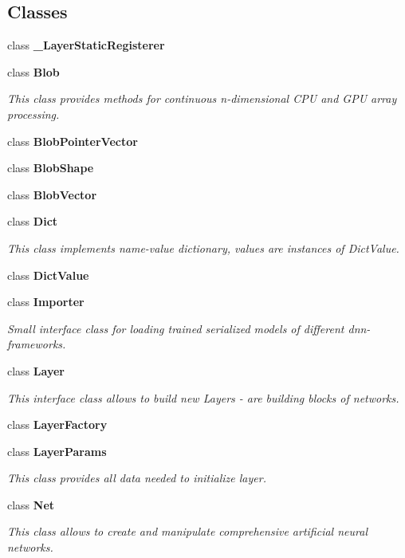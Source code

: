 \subsection*{Classes}
\begin{DoxyCompactItemize}
\item 
class {\bfseries \+\_\+\+Layer\+Static\+Registerer}
\item 
class {\bfseries Blob}
\begin{DoxyCompactList}\small\item\em This class provides methods for continuous n-\/dimensional C\+PU and G\+PU array processing. \end{DoxyCompactList}\item 
class {\bfseries Blob\+Pointer\+Vector}
\item 
class {\bfseries Blob\+Shape}
\item 
class {\bfseries Blob\+Vector}
\item 
class {\bfseries Dict}
\begin{DoxyCompactList}\small\item\em This class implements name-\/value dictionary, values are instances of Dict\+Value. \end{DoxyCompactList}\item 
class {\bfseries Dict\+Value}
\item 
class {\bfseries Importer}
\begin{DoxyCompactList}\small\item\em Small interface class for loading trained serialized models of different dnn-\/frameworks. \end{DoxyCompactList}\item 
class {\bfseries Layer}
\begin{DoxyCompactList}\small\item\em This interface class allows to build new Layers -\/ are building blocks of networks. \end{DoxyCompactList}\item 
class {\bfseries Layer\+Factory}
\item 
class {\bfseries Layer\+Params}
\begin{DoxyCompactList}\small\item\em This class provides all data needed to initialize layer. \end{DoxyCompactList}\item 
class {\bfseries Net}
\begin{DoxyCompactList}\small\item\em This class allows to create and manipulate comprehensive artificial neural networks. \end{DoxyCompactList}\end{DoxyCompactItemize}
